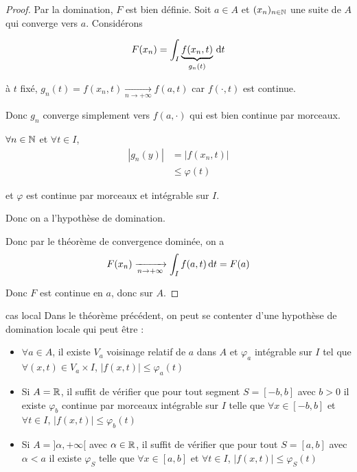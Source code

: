 \begin{proof}
    Par la domination, $F$ est bien définie. Soit $a \in A$ et $(x_n)_{n \in \mathbb{N}}$ une suite de $A$ qui converge 
    vers $a$. Considérons 

    $$F(x_n) = \int_I \underbrace{f(x_n, t)}_{g_n(t)} \,\mathrm{d}t$$
    
    à $t$ fixé, $g_n(t) = f(x_n, t) \xrightarrow[n \to + \infty]{} f(a, t)$ car 
    $f(\cdot, t)$ est continue.

    Donc $g_n$ converge simplement vers $f(a, \cdot)$ qui est bien continue par morceaux. 

    $\forall n \in \mathbb{N}$ et $\forall t \in I$, 
    \begin{align}
        |g_n(y)| & = |f(x_n, t)| \\
        & \leqslant \varphi(t)
    \end{align}

    et $\varphi$ est continue par morceaux et intégrable sur $I$.

    Donc on a l'hypothèse de domination. 

    Donc par le théorème de convergence dominée, on a 
    $$F(x_n) \xrightarrow[n \to + \infty]{} \int_I f(a, t) \,\mathrm{d}t = F(a)$$

    Donc $F$ est continue en $a$, donc sur $A$. 
\end{proof}

\begin{theoreme}{cas local}{}
    Dans le théorème précédent, on peut se contenter d'une hypothèse de domination locale qui 
    peut être : 
    \begin{itemize}
        \item $\forall a \in A$, il existe $V_a$ voisinage relatif de $a$ dans $A$ et $\varphi_a$
        intégrable sur $I$ tel que $\forall (x, t) \in V_a \times I$, $|f(x, t)| \leqslant \varphi_a(t)$
        \item Si $A = \mathbb{R}$, il suffit de vérifier que pour tout segment $S = [-b, b]$ avec $b > 0$ il existe 
        $\varphi_b$ continue par morceaux intégrable sur $I$ telle que 
        $\forall x \in [-b, b]$ et $\forall t \in I$, $|f(x, t)| \leqslant \varphi_b(t)$
        \item Si $A = ]\alpha, + \infty[$ avec $\alpha \in \mathbb{R}$, il suffit de vérifier que pour tout 
        $S = [a, b]$ avec $\alpha <a$ il existe $\varphi_S$ telle que $\forall x \in [a, b]$ et $\forall t \in I$, $|f(x, t)| \leqslant \varphi_S(t)$
    \end{itemize}
\end{theoreme}

